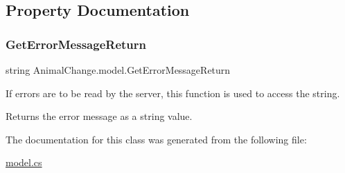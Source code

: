 \subsection{Property Documentation}
\mbox{\label{class_animal_change_1_1model_a987a46cb1a575a4d2c3cd2710dd1af39}} 
\subsubsection{\texorpdfstring{GetErrorMessageReturn}{GetErrorMessageReturn}}
{\footnotesize\ttfamily string Animal\+Change.\+model.\+Get\+Error\+Message\+Return\hspace{0.3cm}{\ttfamily [get]}}



If errors are to be read by the server, this function is used to access the string. 

\begin{DoxyReturn}{Returns}
the error message as a string value. 
\end{DoxyReturn}


The documentation for this class was generated from the following file\+:\begin{DoxyCompactItemize}
\item 
\mbox{\hyperlink{model_8cs}{model.\+cs}}\end{DoxyCompactItemize}
